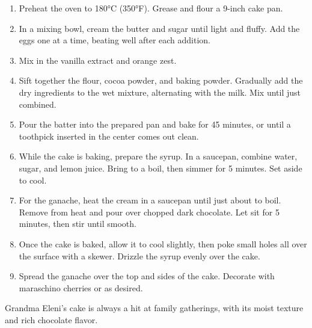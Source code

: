 \begin{enumerate}
    \item Preheat the oven to 180°C (350°F). Grease and flour a 9-inch cake pan.
    \item In a mixing bowl, cream the butter and sugar until light and fluffy. Add the eggs one at a time, beating well after each addition.
    \item Mix in the vanilla extract and orange zest.
    \item Sift together the flour, cocoa powder, and baking powder. Gradually add the dry ingredients to the wet mixture, alternating with the milk. Mix until just combined.
    \item Pour the batter into the prepared pan and bake for 45 minutes, or until a toothpick inserted in the center comes out clean.
    \item While the cake is baking, prepare the syrup. In a saucepan, combine water, sugar, and lemon juice. Bring to a boil, then simmer for 5 minutes. Set aside to cool.
    \item For the ganache, heat the cream in a saucepan until just about to boil. Remove from heat and pour over chopped dark chocolate. Let sit for 5 minutes, then stir until smooth.
    \item Once the cake is baked, allow it to cool slightly, then poke small holes all over the surface with a skewer. Drizzle the syrup evenly over the cake.
    \item Spread the ganache over the top and sides of the cake. Decorate with maraschino cherries or as desired.
\end{enumerate}

Grandma Eleni's cake is always a hit at family gatherings, with its moist texture and rich chocolate flavor.

